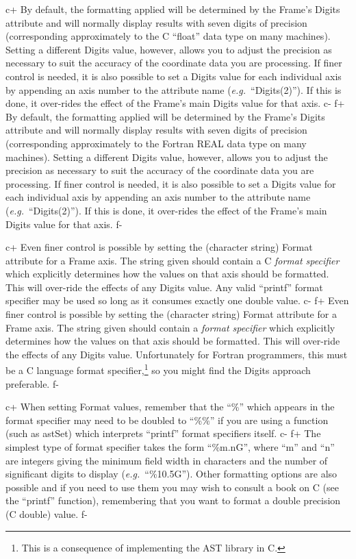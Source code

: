 \documentclass[twoside,11pt]{article}
\begin{document}
c+
By default, the formatting applied will be determined by the Frame's
Digits attribute and will normally display results with seven digits
of precision (corresponding approximately to the C ``float'' data type
on many machines). Setting a different Digits value, however, allows
you to adjust the precision as necessary to suit the accuracy of the
coordinate data you are processing.  If finer control is needed, it is
also possible to set a Digits value for each individual axis by
appending an axis number to the attribute name
({\em{e.g.}}\ ``Digits(2)''). If this is done, it over-rides the
effect of the Frame's main Digits value for that axis.
c-
f+
By default, the formatting applied will be determined by the Frame's
Digits attribute and will normally display results with seven digits
of precision (corresponding approximately to the Fortran REAL data
type on many machines). Setting a different Digits value, however,
allows you to adjust the precision as necessary to suit the accuracy
of the coordinate data you are processing.  If finer control is
needed, it is also possible to set a Digits value for each individual
axis by appending an axis number to the attribute name
({\em{e.g.}}\ ``Digits(2)''). If this is done, it over-rides the
effect of the Frame's main Digits value for that axis.
f-

c+
Even finer control is possible by setting the (character string)
Format attribute for a Frame axis. The string given should contain a C
{\em{format specifier}} which explicitly determines how the values on
that axis should be formatted. This will over-ride the effects of any
Digits value. Any valid ``printf'' format specifier may be used so
long as it consumes exactly one double value.
c-
f+
Even finer control is possible by setting the (character string)
Format attribute for a Frame axis. The string given should contain a
{\em{format specifier}} which explicitly determines how the values on
that axis should be formatted. This will over-ride the effects of any
Digits value.  Unfortunately for Fortran programmers, this must be a C
language format specifier,\footnote{This is a consequence of
implementing the AST library in C.} so you might find the Digits
approach preferable.
f-

c+
When setting Format values, remember that the ``\%'' which appears in
the format specifier may need to be doubled to ``\%\%'' if you are
using a function (such as astSet) which interprets ``printf'' format
specifiers itself.
c-
f+
The simplest type of format specifier takes the form ``\%m.nG'', where
``m'' and ``n'' are integers giving the minimum field width in
characters and the number of significant digits to display
({\em{e.g.}}\ ``\%10.5G''). Other formatting options are also possible
and if you need to use them you may wish to consult a book on C (see
the ``printf'' function), remembering that you want to format a double
precision (C double) value.
f-
\end{document}
